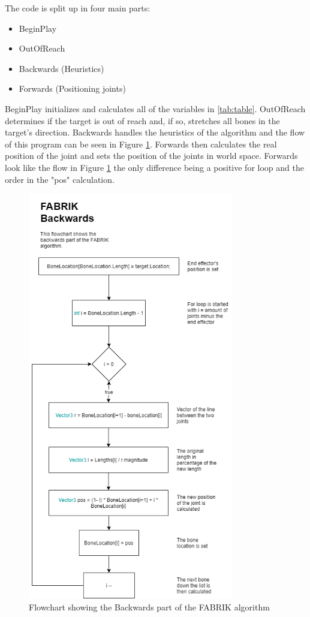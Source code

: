 The code is split up in four main parts:

\begin{itemize}
\item BeginPlay
\item OutOfReach
\item Backwards (Heuristics)
\item Forwards (Positioning joints)
\end{itemize}

BeginPlay initializes and calculates all of the variables in \autoref{tab:table}. OutOfReach determines if the target is out of reach and, if so, stretches all bones in the target's direction. 
Backwards handles the heuristics of the algorithm and the flow of this program can be seen in Figure \ref{fig:flow}. Forwards then calculates the real position of the joint and sets the position of the joints in world space. Forwards look like the flow in Figure \ref{fig:flow} the only difference being a positive for loop and the order in the "pos" calculation.

\begin{figure}[H]
	\centering
	\includegraphics[width=0.8\textwidth]{FABRIK/Flowchart.png}
	\caption{Flowchart showing the Backwards part of the FABRIK algorithm}
	\label{fig:flow}
\end{figure}

